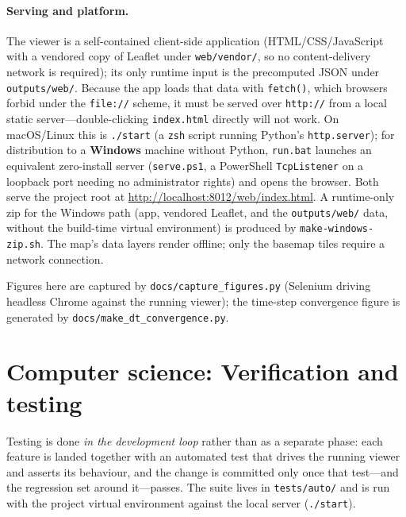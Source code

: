 \documentclass[11pt]{article}
\begin{document}
\paragraph{Serving and platform.}
The viewer is a self-contained client-side application (HTML/CSS/JavaScript with a
vendored copy of Leaflet under \texttt{web/vendor/}, so no content-delivery network
is required); its only runtime input is the precomputed JSON under
\texttt{outputs/web/}. Because the app loads that data with \texttt{fetch()}, which
browsers forbid under the \texttt{file://} scheme, it must be served over
\texttt{http://} from a local static server---double-clicking \texttt{index.html}
directly will not work. On macOS/Linux this is \texttt{./start} (a \texttt{zsh}
script running Python's \texttt{http.server}); for distribution to a
\textbf{Windows} machine without Python, \texttt{run.bat} launches an equivalent
zero-install server (\texttt{serve.ps1}, a PowerShell \texttt{TcpListener} on a
loopback port needing no administrator rights) and opens the browser. Both serve the
project root at \url{http://localhost:8012/web/index.html}. A runtime-only zip for
the Windows path (app, vendored Leaflet, and the \texttt{outputs/web/} data, without
the build-time virtual environment) is produced by \texttt{make-windows-zip.sh}. The
map's data layers render offline; only the basemap tiles require a network
connection.

Figures here are captured by \texttt{docs/capture\_figures.py} (Selenium driving
headless Chrome against the running viewer); the time-step convergence figure is
generated by \texttt{docs/make\_dt\_convergence.py}.

\section{Computer science: Verification and testing}\label{sec:verification}
Testing is done \emph{in the development loop} rather than as a separate phase: each
feature is landed together with an automated test that drives the running viewer and
asserts its behaviour, and the change is committed only once that test---and the
regression set around it---passes. The suite lives in \texttt{tests/auto/} and is run
with the project virtual environment against the local server (\texttt{./start}).
\end{document}
